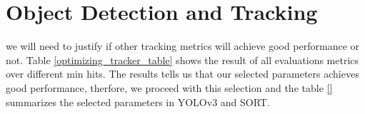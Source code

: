 \section{Object Detection and Tracking}
\label{sec:appendix/section_a}

we will need to justify if other tracking metrics will achieve good performance or not. Table \ref{optimizing_tracker_table} shows the result of all evaluations metrics over different min hits. The results tells us that our selected parameters achieves good performance, therfore, we proceed with this selection and the table \ref{} summarizes the selected parameters in YOLOv3 and SORT.



